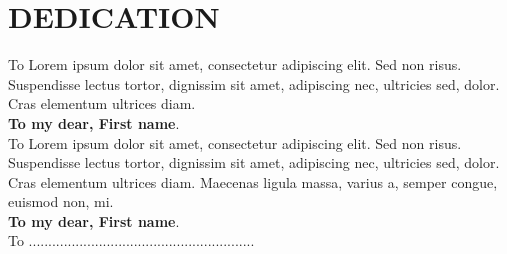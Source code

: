 \chapter*{DEDICATION}
\thispagestyle{MyStyle}
%
\begin{center}
{\huge To} Lorem ipsum dolor sit amet, consectetur adipiscing elit. Sed non risus. Suspendisse lectus tortor, dignissim sit amet, adipiscing nec, ultricies sed, dolor. Cras elementum ultrices diam.\\ 
\textbf{To my dear, First name}.\\
{\huge To} Lorem ipsum dolor sit amet, consectetur adipiscing elit. Sed non risus. Suspendisse lectus tortor, dignissim sit amet, adipiscing nec, ultricies sed, dolor. Cras elementum ultrices diam. Maecenas ligula massa, varius a, semper congue, euismod non, mi. \\
\textbf{To my dear, First name}.\\
{\huge To} ..........................................................
\end{center}
